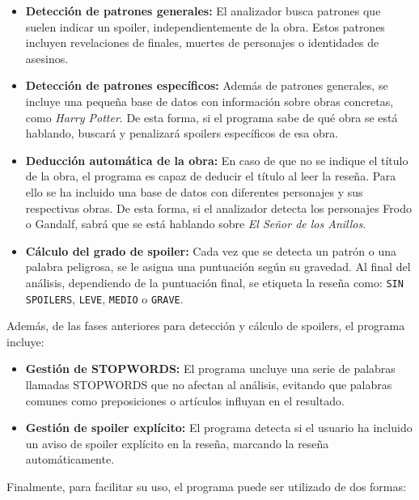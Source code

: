 \documentclass{article}
\begin{document}
\begin{itemize}
    \item \textbf{Detección de patrones generales:} El analizador busca patrones que suelen indicar un spoiler, independientemente de la obra. Estos patrones incluyen revelaciones de finales, muertes de personajes o identidades de asesinos.
    
    \item \textbf{Detección de patrones específicos:} Además de patrones generales, se incluye una pequeña base de datos con información sobre obras concretas, como \textit{Harry Potter}. De esta forma, si el programa sabe de qué obra se está hablando, buscará y penalizará spoilers específicos de esa obra.
    
    \item \textbf{Deducción automática de la obra:} En caso de que no se indique el título de la obra, el programa es capaz de deducir el título al leer la reseña. Para ello se ha incluido una base de datos con diferentes personajes y sus respectivas obras. De esta forma, si el analizador detecta los personajes Frodo o Gandalf, sabrá que se está hablando sobre \textit{El Señor de los Anillos}.
    
    \item \textbf{Cálculo del grado de spoiler:} Cada vez que se detecta un patrón o una palabra peligrosa, se le asigna una puntuación según su gravedad. Al final del análisis, dependiendo de la puntuación final, se etiqueta la reseña como: \texttt{SIN SPOILERS}, \texttt{LEVE}, \texttt{MEDIO} o \texttt{GRAVE}.
\end{itemize}

Además, de las fases anteriores para detección y cálculo de spoilers, el programa incluye:
\begin{itemize}
    \item \textbf{Gestión de STOPWORDS:} El programa uncluye una serie de palabras llamadas STOPWORDS que no afectan al análisis, evitando que palabras comunes como preposiciones o artículos influyan en el resultado.
    \item \textbf{Gestión de spoiler explícito:} El programa detecta si el usuario ha incluido un aviso de spoiler explícito en la reseña, marcando la reseña automáticamente.
\end{itemize}

Finalmente, para facilitar su uso, el programa puede ser utilizado de dos formas:
\end{document}
